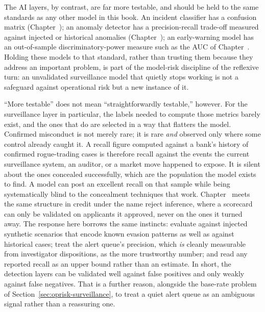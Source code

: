 \documentclass[../ai_in_finance]{subfiles}
\begin{document}
The AI layers, by contrast, are far more testable, and should be held to the same standards as any other model in this book. An incident classifier has a confusion matrix (Chapter~); an anomaly detector has a precision-recall trade-off measured against injected or historical anomalies (Chapter~); an early-warning model has an out-of-sample discriminatory-power measure such as the AUC of Chapter~. Holding these models to that standard, rather than trusting them because they address an important problem, is part of the model-risk discipline of the reflexive turn: an unvalidated surveillance model that quietly stops working is not a safeguard against operational risk but a new instance of it.

``More testable'' does not mean ``straightforwardly testable,'' however. For the surveillance layer in particular, the labels needed to compute those metrics barely exist, and the ones that do are selected in a way that flatters the model. Confirmed misconduct is not merely rare; it is rare \emph{and} observed only where some control already caught it. A recall figure computed against a bank's history of confirmed rogue-trading cases is therefore recall against the events the current surveillance system, an auditor, or a market move happened to expose. It is silent about the ones concealed successfully, which are the population the model exists to find. A model can post an excellent recall on that sample while being systematically blind to the concealment techniques that work. Chapter~ meets the same structure in credit under the name reject inference, where a scorecard can only be validated on applicants it approved, never on the ones it turned away. The response here borrows the same instincts: evaluate against injected synthetic scenarios that encode known evasion patterns as well as against historical cases; treat the alert queue's precision, which \emph{is} cleanly measurable from investigator dispositions, as the more trustworthy number; and read any reported recall as an upper bound rather than an estimate. In short, the detection layers can be validated well against false positives and only weakly against false negatives. That is a further reason, alongside the base-rate problem of Section~\ref{sec:oprisk-surveillance}, to treat a quiet alert queue as an ambiguous signal rather than a reassuring one.

\label{sec:oprisk-vignette}
\end{document}
